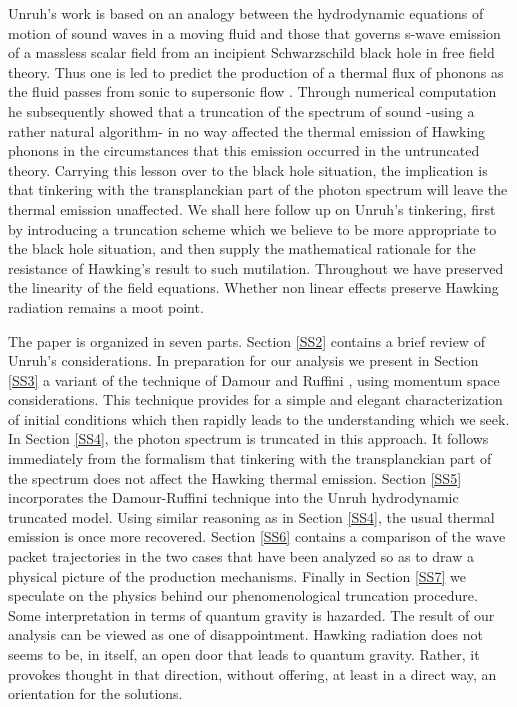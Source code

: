 \documentclass[12pt]{article}
\begin{document}
Unruh's work is based on an analogy between the hydrodynamic equations of motion
of sound waves in a moving fluid and those that governs s-wave emission of a
massless scalar field from an incipient Schwarzschild black hole in free field
theory. Thus one is led to predict the production of a thermal flux of phonons
as the fluid passes from sonic to supersonic flow \cite{Un81}. Through numerical
computation he subsequently showed \cite{Un94} that a truncation of the
spectrum of sound -using a rather natural algorithm- in no way affected
the thermal emission of Hawking phonons in the circumstances that this
emission occurred in the untruncated theory. Carrying this lesson over
to the black hole situation, the implication is that tinkering with the
transplanckian part of the photon spectrum  will leave the thermal
emission unaffected. We shall here follow up on Unruh's tinkering, first
by introducing a truncation scheme which we believe to be more
appropriate to the black hole situation, and then
 supply
the mathematical rationale for the resistance of Hawking's result to
such mutilation. Throughout we have preserved the linearity of the
field equations. Whether non linear effects preserve Hawking radiation
remains a moot point.




The paper is organized in seven parts. Section \ref{SS2} contains a brief review
of Unruh's considerations. In preparation for our analysis we present in Section
\ref{SS3} a variant of the technique of Damour and Ruffini 
 \cite{DaRu}, using
momentum space considerations. This technique provides for a simple and elegant
characterization of initial conditions which then rapidly leads to the
understanding which we seek. In Section \ref{SS4}, the photon spectrum is
truncated in this approach. It follows immediately from the formalism that
tinkering with the transplanckian part of the spectrum does not affect the
Hawking thermal emission. Section \ref{SS5} incorporates the Damour-Ruffini technique into the
Unruh hydrodynamic truncated model. Using similar reasoning as in Section
\ref{SS4}, the usual thermal emission is once more recovered. Section \ref{SS6}
contains a comparison of the wave packet trajectories in the two cases that have
been analyzed so as to draw a physical picture of the production mechanisms.
Finally in Section \ref{SS7} we speculate on the physics behind our
phenomenological truncation procedure. Some interpretation in terms of quantum
gravity is hazarded. The result of our analysis can be viewed as one of
disappointment. Hawking radiation does not seems to be, in itself,  an open door
that leads to quantum gravity. Rather, it provokes thought in that direction,
without offering, at least in a direct way, an orientation for the solutions.
\end{document}
